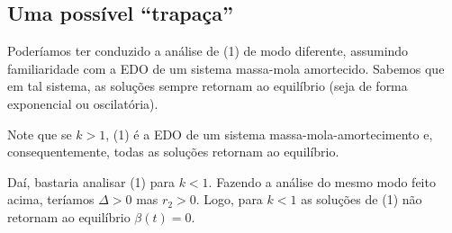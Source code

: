 \documentclass{article}
\begin{document}
\subsection{Uma possível ``trapaça''}
\hspace{12pt} Poderíamos ter conduzido a análise de (1) de modo diferente, assumindo familiaridade com a EDO de um sistema massa-mola amortecido. Sabemos que em tal sistema, as soluções sempre retornam ao equilíbrio (seja de forma exponencial ou oscilatória). 
\vspace{0.2cm}
\par Note que se $k>1$, (1) é a EDO de um sistema massa-mola-amortecimento e, consequentemente, todas as soluções retornam ao equilíbrio. 
\vspace{0.2cm}
\par Daí, bastaria analisar (1) para $k<1$. Fazendo a análise do mesmo modo feito acima, teríamos $\Delta > 0$ mas $r_2 > 0$. Logo, para $k<1$ as soluções de (1) não retornam ao equilíbrio $\beta (t) = 0$. 
\end{document}
